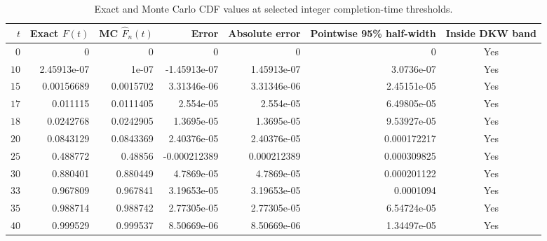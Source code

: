 \begin{table}
\caption{Exact and Monte Carlo CDF values at selected integer completion-time thresholds.}
\label{tab:selected_discrete_cdf_thresholds}
\begin{tabular}{rrrrrrc}
\toprule
$t$ & Exact $F(t)$ & MC $\widehat F_n(t)$ & Error & Absolute error & Pointwise 95\% half-width & Inside DKW band \\
\midrule
$0$ & 0 & 0 & 0 & 0 & 0 & Yes \\
$10$ & 2.45913e-07 & 1e-07 & -1.45913e-07 & 1.45913e-07 & 3.0736e-07 & Yes \\
$15$ & 0.00156689 & 0.0015702 & 3.31346e-06 & 3.31346e-06 & 2.45151e-05 & Yes \\
$17$ & 0.011115 & 0.0111405 & 2.554e-05 & 2.554e-05 & 6.49805e-05 & Yes \\
$18$ & 0.0242768 & 0.0242905 & 1.3695e-05 & 1.3695e-05 & 9.53927e-05 & Yes \\
$20$ & 0.0843129 & 0.0843369 & 2.40376e-05 & 2.40376e-05 & 0.000172217 & Yes \\
$25$ & 0.488772 & 0.48856 & -0.000212389 & 0.000212389 & 0.000309825 & Yes \\
$30$ & 0.880401 & 0.880449 & 4.7869e-05 & 4.7869e-05 & 0.000201122 & Yes \\
$33$ & 0.967809 & 0.967841 & 3.19653e-05 & 3.19653e-05 & 0.0001094 & Yes \\
$35$ & 0.988714 & 0.988742 & 2.77305e-05 & 2.77305e-05 & 6.54724e-05 & Yes \\
$40$ & 0.999529 & 0.999537 & 8.50669e-06 & 8.50669e-06 & 1.34497e-05 & Yes \\
\bottomrule
\end{tabular}
\end{table}
